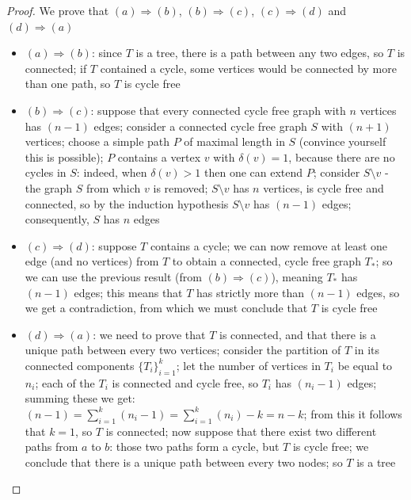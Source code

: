 \begin{proof} We prove that $(a) \Rightarrow (b)$, $(b) \Rightarrow
(c)$, $(c) \Rightarrow (d)$ and $(d) \Rightarrow (a)$
\begin{itemize}
\item $(a) \Rightarrow (b)$: since $T$ is a tree, there is a path
between any two edges, so $T$ is connected; if $T$ contained a
cycle, some vertices would be connected by more than one path, so $T$
is cycle free
\item $(b) \Rightarrow (c)$:
{ suppose that every connected cycle free graph with $n$ vertices has
$(n-1)$ edges; consider a connected cycle free graph $S$ with $(n+1)$
vertices; choose a simple path $P$ of maximal length in $S$
(convince yourself this is possible); $P$ contains a vertex $v$ with
$\delta(v) = 1$, because there are no cycles in $S$: indeed, when
$\delta(v) > 1$ then one can extend $P$; consider $S \setminus v$ -
the graph $S$ from which $v$ is removed; $S \setminus v$ has $n$
vertices, is cycle free and connected, so by the induction hypothesis $S \setminus v$
has $(n-1)$ edges; consequently, $S$ has $n$ edges}

\item $(c) \Rightarrow (d)$: suppose $T$ contains a cycle; we can now
remove at least one edge (and no vertices) from $T$ to obtain a
connected, cycle free graph $T_{*}$; so we can use the previous result
(from $(b) \Rightarrow (c)$), meaning $T_{*}$ has $(n-1)$ edges; this
means that $T$ has strictly more than $(n-1)$ edges, so we get a
contradiction, from which we must conclude that $T$ is cycle free

\item $(d) \Rightarrow (a)$:
we need to prove that $T$ is connected, and that there is a unique
path between every two vertices; consider the partition of $T$ in its
connected components $\{T_{i}\}_{i=1}^{k}$; let the number of vertices
in $T_{i}$ be equal to $n_{i}$; each of the $T_{i}$ is connected and
cycle free, so $T_{i}$ has $(n_{i}-1)$ edges; summing these we get:
$(n-1) = \sum_{i=1}^{k} (n_{i}-1) = \sum_{i=1}^{k} (n_{i}) - k = n - k$;
from this it follows that $k=1$, so $T$ is connected; now suppose that
there exist two different paths from $a$ to $b$: those two paths form
a cycle, but $T$ is cycle free; we conclude that there is a unique
path between every two nodes; so $T$ is a tree

\end{itemize}
\end{proof}

